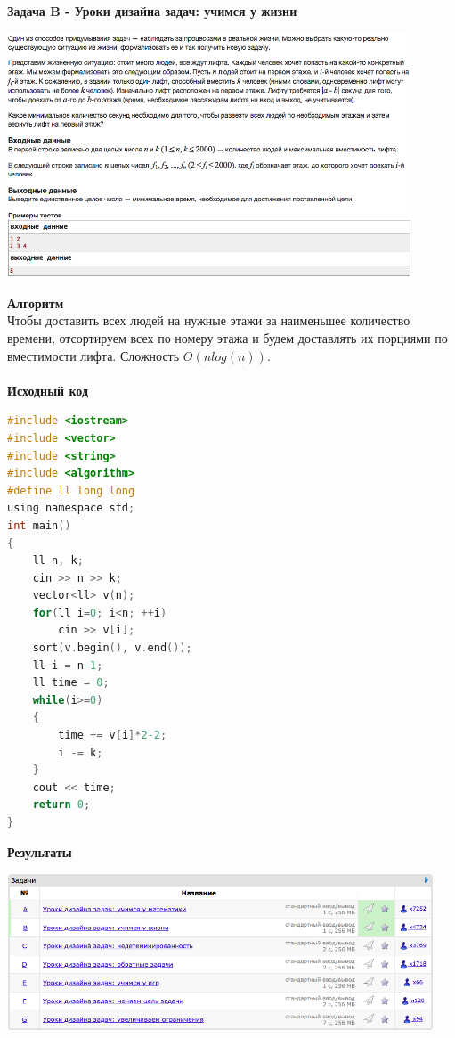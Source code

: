 \documentclass[a4paper,12pt]{article}
\begin{document}
\newpage
\textbf{{\large Задача B - Уроки дизайна задач: учимся у жизни}} \\
\begin{center}
\includegraphics[width=0.9\textwidth]{C_270/C_270_B.png}\\ [1cm]
\end{center}
\textbf{{\large Алгоритм}} \\
Чтобы доставить всех людей на нужные этажи за наименьшее количество времени, отсортируем всех по номеру этажа и будем доставлять их порциями по вместимости лифта. Сложность $O(nlog(n))$.\\ 
\\
\textbf{{\large Исходный код}}
\begin{lstlisting}[language=C]
#include <iostream>
#include <vector>
#include <string>
#include <algorithm>
#define ll long long
using namespace std;
int main()
{
    ll n, k;
    cin >> n >> k;
    vector<ll> v(n);
    for(ll i=0; i<n; ++i)
        cin >> v[i];
    sort(v.begin(), v.end());
    ll i = n-1;
    ll time = 0;
    while(i>=0)
    {
        time += v[i]*2-2;
        i -= k;
    }
    cout << time;
    return 0;
}
\end{lstlisting}

\textbf{{\large Результаты}} \\
\begin{center}
\includegraphics[width=0.95\textwidth]{C_270/A_C_270_result.png}\\ [1cm]
\end{center}
\end{document}
